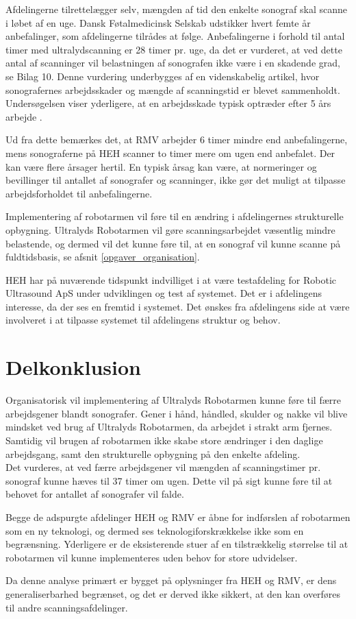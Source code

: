 Afdelingerne tilrettelægger selv, mængden af tid den enkelte sonograf skal scanne i løbet af en uge. Dansk Føtalmedicinsk Selskab udstikker hvert femte år anbefalinger, som afdelingerne tilrådes at følge. Anbefalingerne i forhold til antal timer med ultralydscanning er 28 timer pr. uge, da det er vurderet, at ved dette antal af scanninger vil belastningen af sonografen ikke være i en skadende grad, se Bilag 10. Denne vurdering underbygges af en videnskabelig artikel, hvor sonografernes arbejdsskader og mængde af scanningstid er blevet sammenholdt. Undersøgelsen viser yderligere, at en arbejdsskade typisk optræder efter 5 års arbejde \cite{35}.

Ud fra dette bemærkes det, at RMV arbejder 6 timer mindre end anbefalingerne, mens sonograferne på HEH scanner to timer mere om ugen end anbefalet. Der kan være flere årsager hertil. En typisk årsag kan være, at normeringer og bevillinger til antallet af sonografer og scanninger, ikke gør det muligt at tilpasse arbejdsforholdet til anbefalingerne. 

Implementering af robotarmen vil føre til en ændring i afdelingernes strukturelle opbygning. Ultralyds Robotarmen vil gøre scanningsarbejdet væsentlig mindre belastende, og dermed vil det kunne føre til, at en sonograf vil kunne scanne på fuldtidsbasis, se afsnit \ref{opgaver_organisation}.  

HEH har på nuværende tidspunkt indvilliget i at være testafdeling for Robotic Ultrasound ApS under udviklingen og test af systemet. Det er i afdelingens interesse, da der ses en fremtid i systemet. Det ønskes fra afdelingens side at være involveret i at tilpasse systemet til afdelingens struktur og behov. 

\section{Delkonklusion}
Organisatorisk vil implementering af Ultralyds Robotarmen kunne føre til færre arbejdsgener blandt sonografer. Gener i hånd, håndled, skulder og nakke vil blive mindsket ved brug af Ultralyds Robotarmen, da arbejdet i strakt arm fjernes.\\ Samtidig vil brugen af robotarmen ikke skabe store ændringer i den daglige arbejdsgang, samt den strukturelle opbygning på den enkelte afdeling. \\
Det vurderes, at ved færre arbejdsgener vil mængden af scanningstimer pr. sonograf kunne hæves til 37 timer om ugen. Dette vil på sigt kunne føre til at behovet for antallet af sonografer vil falde.

Begge de adspurgte afdelinger HEH og RMV er åbne for indførslen af robotarmen som en ny teknologi, og dermed ses teknologiforskrækkelse ikke som en begrænsning. Yderligere er de eksisterende stuer af en tilstrækkelig størrelse til at robotarmen vil kunne implementeres uden behov for store udvidelser. 

Da denne analyse primært er bygget på oplysninger fra HEH og RMV, er dens generaliserbarhed begrænset, og det er derved ikke sikkert, at den kan overføres til andre scanningsafdelinger. 
